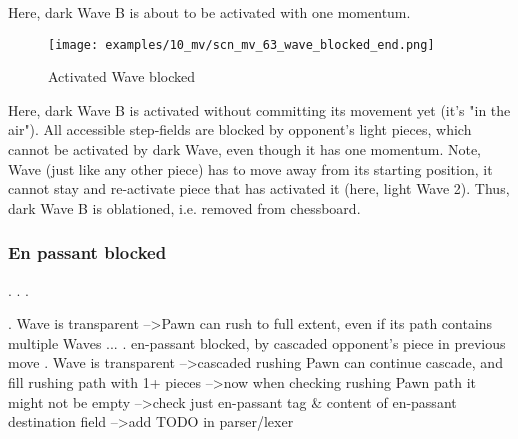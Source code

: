 Here, dark Wave B is about to be activated with one momentum.

\clearpage %

\vspace*{-2.1\baselineskip}
\noindent
\begin{figure}[h]
\texttt{[image: examples/10\_mv/scn\_mv\_63\_wave\_blocked\_end.png]}
\caption{Activated Wave blocked}
\label{fig:scn_mv_63_wave_blocked_end}
\end{figure}

Here, dark Wave B is activated without committing its movement yet (it's "in the air").
All accessible step-fields are blocked by opponent's light pieces, which cannot be
activated by dark Wave, even though it has one momentum.
Note, Wave (just like any other piece) has to move away from its starting position,
it cannot stay and re-activate piece that has activated it (here, light Wave 2).
Thus, dark Wave B is oblationed, i.e. removed from chessboard.

\clearpage %

\subsubsection*{En passant blocked}
\label{sec:Miranda's veil/Wave/Cascading opponent/En passant blocked}

. . .

\clearpage %

\noindent
\TODO {}. Wave is transparent --\textgreater Pawn can rush to full extent, even if its
   path contains multiple Waves ... . en-passant blocked, by cascaded opponent's piece in previous move . Wave is transparent --\textgreater cascaded rushing Pawn can continue cascade,
   and fill rushing path with 1+ pieces --\textgreater now when checking rushing
   Pawn path it might not be empty --\textgreater check just en-passant tag \&
   content of en-passant destination field --\textgreater add TODO in parser/lexer \newline

